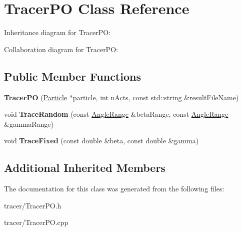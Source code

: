 \hypertarget{class_tracer_p_o}{}\section{Tracer\+PO Class Reference}
\label{class_tracer_p_o}


Inheritance diagram for Tracer\+PO\+:


Collaboration diagram for Tracer\+PO\+:
\subsection*{Public Member Functions}
\begin{DoxyCompactItemize}
\item 
\mbox{\label{class_tracer_p_o_a0868dc6583ce53ecfc54ea4cffcfbb6a}} 
{\bfseries Tracer\+PO} (\mbox{\hyperlink{class_particle}{Particle}} $\ast$particle, int n\+Acts, const std\+::string \&result\+File\+Name)
\item 
\mbox{\label{class_tracer_p_o_a48cbbcf3794ae8b1a2ef4bb3891ba4e8}} 
void {\bfseries Trace\+Random} (const \mbox{\hyperlink{struct_angle_range}{Angle\+Range}} \&beta\+Range, const \mbox{\hyperlink{struct_angle_range}{Angle\+Range}} \&gamma\+Range)
\item 
\mbox{\label{class_tracer_p_o_a574b8cd5022759ce5d31c40b334ed395}} 
void {\bfseries Trace\+Fixed} (const double \&beta, const double \&gamma)
\end{DoxyCompactItemize}
\subsection*{Additional Inherited Members}


The documentation for this class was generated from the following files\+:\begin{DoxyCompactItemize}
\item 
tracer/Tracer\+P\+O.\+h\item 
tracer/Tracer\+P\+O.\+cpp\end{DoxyCompactItemize}
